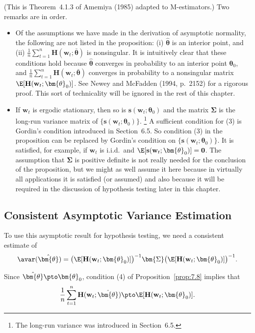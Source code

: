 (This is Theorem~4.1.3 of Amemiya (1985) adapted to M-estimators.) Two remarks are in order.

\begin{itemize}
\item Of the assumptions we have made in the derivation of asymptotic normality, the following are not listed in the proposition: (i) $\hat{\bm{\theta}}$ is an interior point, and (ii) $\frac{1}{n}\sum_{t=1}^{n}\mathbf{H}(\mathbf{w}_t; \bar{\bm{\theta}})$ is nonsingular. It is intuitively clear that these conditions hold because $\hat{\bm{\theta}}$ converges in probability to an interior point $\bm{\theta}_0$, and $\frac{1}{n}\sum_{t=1}^{n}\mathbf{H}(\mathbf{w}_t; \bar{\bm{\theta}})$ converges in probability to a nonsingular matrix $\E[\mathbf{H}(\mathbf{w}_t; \bm{\theta}_0)]$. See Newey and McFadden (1994, p.~2152) for a rigorous proof. This sort of technicality will be ignored in the rest of this chapter.

\item If $\mathbf{w}_t$ is ergodic stationary, then so is $\mathbf{s}(\mathbf{w}_t; \bm{\theta}_0)$ and the matrix $\bm{\Sigma}$ is the long-run variance matrix of $\{\mathbf{s}(\mathbf{w}_t; \bm{\theta}_0)\}$.%
\footnote{The long-run variance was introduced in Section~6.5.}
A sufficient condition for (3) is Gordin's condition introduced in Section~6.5. So condition (3) in the proposition can be replaced by Gordin's condition on $\{\mathbf{s}(\mathbf{w}_t; \bm{\theta}_0)\}$. It is satisfied, for example, if $\mathbf{w}_t$ is i.i.d.\ and $\E[\mathbf{s}(\mathbf{w}_t; \bm{\theta}_0)] = \mathbf{0}$. The assumption that $\bm{\Sigma}$ is positive definite is not really needed for the conclusion of the proposition, but we might as well assume it here because in virtually all applications it is satisfied (or assumed) and also because it will be required in the discussion of hypothesis testing later in this chapter.
\end{itemize}

\subsection*{Consistent Asymptotic Variance Estimation}

To use this asymptotic result for hypothesis testing, we need a consistent estimate of
\[
\avar(\hat{\bm{\theta}}) = \bigl(\E[\mathbf{H}(\mathbf{w}_t; \bm{\theta}_0)]\bigr)^{-1} \bm{\Sigma} \bigl(\E[\mathbf{H}(\mathbf{w}_t; \bm{\theta}_0)]\bigr)^{-1}.
\]

Since $\hat{\bm{\theta}} \pto \bm{\theta}_0$, condition (4) of Proposition~\ref{prop:7.8} implies that
\[
\frac{1}{n}\sum_{t=1}^{n}\mathbf{H}(\mathbf{w}_t; \hat{\bm{\theta}}) \pto \E[\mathbf{H}(\mathbf{w}_t; \bm{\theta}_0)].
\]

